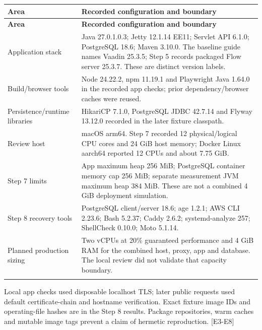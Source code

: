 \documentclass[11pt,a4paper]{article}
\begin{document}
{\fontsize{9.5}{11.5}\selectfont
\begin{longtable}{@{}>{\raggedright\arraybackslash}p{}>{\raggedright\arraybackslash}p{}@{}}\toprule
\textbf{Area} & \textbf{Recorded configuration and boundary} \\ \midrule\endfirsthead
\toprule\textbf{Area} & \textbf{Recorded configuration and boundary} \\ \midrule\endhead
\bottomrule\endfoot
Application stack & Java 27.0.1.0.3; Jetty 12.1.14 EE11; Servlet API 6.1.0; PostgreSQL 18.6; Maven 3.10.0. The baseline guide names Vaadin 25.3.5; Step 5 records packaged Flow server 25.3.7. These are distinct version labels. \\ \addlinespace[3pt]
Build/\allowbreak{}browser tools & Node 24.22.2, npm 11.19.1 and Playwright Java 1.64.0 in the recorded app checks; prior dependency/\allowbreak{}browser caches were reused. \\ \addlinespace[3pt]
Persistence/\allowbreak{}runtime libraries & HikariCP 7.1.0, PostgreSQL JDBC 42.7.14 and Flyway 13.12.0 recorded in the later fixture classpath. \\ \addlinespace[3pt]
Review host & macOS arm64. Step 7 recorded 12 physical/\allowbreak{}logical CPU cores and 24 GiB host memory; Docker Linux aarch64 reported 12 CPUs and about 7.75 GiB. \\ \addlinespace[3pt]
Step 7 limits & App maximum heap 256 MiB; PostgreSQL container memory cap 256 MiB; separate measurement JVM maximum heap 384 MiB. These are not a combined 4 GiB deployment simulation. \\ \addlinespace[3pt]
Step 8 recovery tools & PostgreSQL client/\allowbreak{}server 18.6; age 1.2.1; AWS CLI 2.23.6; Bash 5.2.37; Caddy 2.6.2; systemd-analyze 257; ShellCheck 0.10.0; Moto 5.1.14. \\ \addlinespace[3pt]
Planned production sizing & Two vCPUs at 20\% guaranteed performance and 4 GiB RAM for the combined host, proxy, app and database. The local review did not validate that capacity boundary. \\ \addlinespace[3pt]
\end{longtable}}

Local app checks used disposable localhost TLS; later public requests used default certificate-chain and hostname verification. Exact fixture image IDs and operating-file hashes are in the Step 8 results. Package repositories, warm caches and mutable image tags prevent a claim of hermetic reproduction. [E3-E8]
\end{document}
